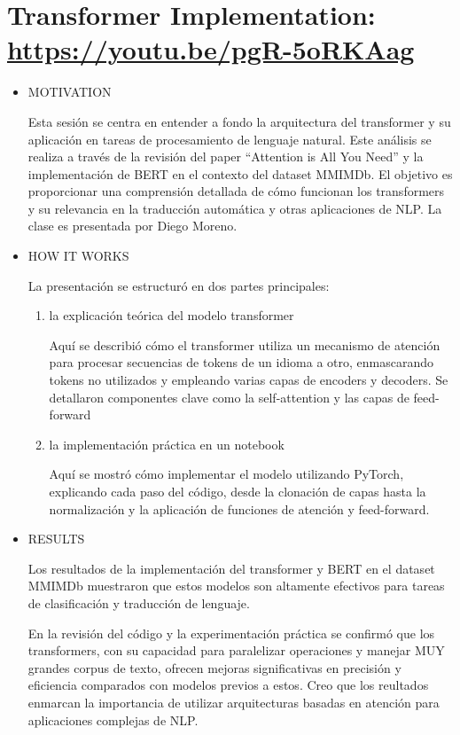 \documentclass[letter, 11pt, twoside]{report}
\begin{document}
\section*{Transformer Implementation: \color{mirosa}\url{https://youtu.be/pgR-5oRKAag }}
\begin{itemize}
    \item MOTIVATION
    
    Esta sesión se centra en entender a fondo la arquitectura del transformer y su aplicación en tareas de procesamiento de lenguaje natural. Este análisis se realiza a través de la revisión del paper “Attention is All You Need” y la implementación de BERT en el contexto del dataset MMIMDb. El objetivo es proporcionar una comprensión detallada de cómo funcionan los transformers y su relevancia en la traducción automática y otras aplicaciones de NLP. La clase es presentada por Diego Moreno.
    \item HOW IT WORKS
    
    La presentación se estructuró en dos partes principales: 
    \begin{enumerate}
        \item la explicación teórica del modelo transformer
        
        Aquí se describió cómo el transformer utiliza un mecanismo de atención para procesar secuencias de tokens de un idioma a otro, enmascarando tokens no utilizados y empleando varias capas de encoders y decoders. Se detallaron componentes clave como la self-attention y las capas de feed-forward
        \item la implementación práctica en un notebook
        
        Aquí se mostró cómo implementar el modelo utilizando PyTorch, explicando cada paso del código, desde la clonación de capas hasta la normalización y la aplicación de funciones de atención y feed-forward.
    \end{enumerate} 
    \item RESULTS
    
    Los resultados de la implementación del transformer y BERT en el dataset MMIMDb muestraron que estos modelos son altamente efectivos para tareas de clasificación y traducción de lenguaje.
    
    En la revisión del código y la experimentación práctica se confirmó que los transformers, con su capacidad para paralelizar operaciones y manejar MUY grandes corpus de texto, ofrecen mejoras significativas en precisión y eficiencia comparados con modelos previos a estos. Creo que los reultados enmarcan la importancia de utilizar arquitecturas basadas en atención para aplicaciones complejas de NLP.


\end{itemize}
\end{document}
